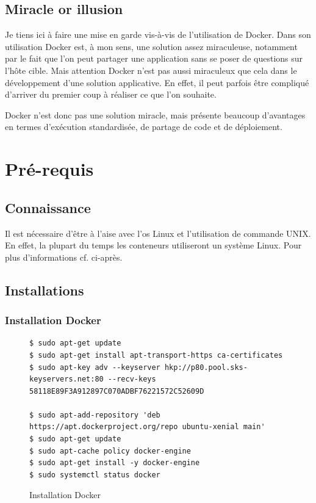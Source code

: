 \subsection{Miracle or illusion}
Je tiens ici à faire une mise en garde vis-à-vis de l'utilisation de Docker. Dans son utilisation Docker est, à mon sens, une solution assez miraculeuse, notamment par le fait que l'on peut partager une application sans se poser de questions sur l'hôte cible. Mais attention Docker n'est pas aussi miraculeux que cela dans le développement d'une solution applicative. En effet, il peut parfois être compliqué d'arriver du premier coup à réaliser ce que l'on souhaite.

Docker n'est donc pas une solution miracle, mais présente beaucoup d'avantages en termes d'exécution standardisée, de partage de code et de déploiement.

\section{Pré-requis}
\subsection{Connaissance}
Il est nécessaire d'être à l’aise avec l'\gls{os} Linux et l'utilisation de commande UNIX. En effet, la plupart du temps les conteneurs utiliseront un système Linux. Pour plus d'informations cf. ci-après.


\subsection{Installations}
\lstset{language=bash}

\subsubsection{Installation Docker}
\begin{figure}[H] 
\centering 
\begin{lstlisting}[frame=single]
$ sudo apt-get update
$ sudo apt-get install apt-transport-https ca-certificates
$ sudo apt-key adv --keyserver hkp://p80.pool.sks-keyservers.net:80 --recv-keys 58118E89F3A912897C070ADBF76221572C52609D

$ sudo apt-add-repository 'deb https://apt.dockerproject.org/repo ubuntu-xenial main'
$ sudo apt-get update
$ sudo apt-cache policy docker-engine
$ sudo apt-get install -y docker-engine
$ sudo systemctl status docker
\end{lstlisting}
\caption[Code - Installation Docker]{Installation Docker}
\label{fig:installDocker} 
\end{figure}

